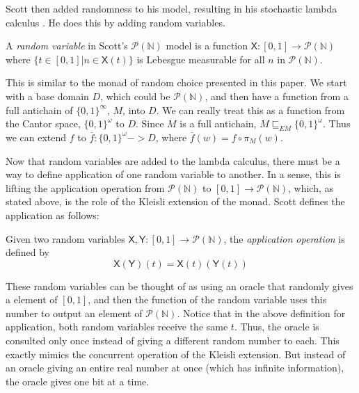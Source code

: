 Scott then added randomness to his model, resulting in his stochastic lambda calculus \cite{scott2014stochastic}.  He does this by adding random variables.

\begin{definition}
A \emph{random variable} in Scott's $\mathcal{P}(\mathbb{N})$ model is a function $\mathsf{X}:[0,1]\to \mathcal{P}(\mathbb{N})$ where $\{t\in [0,1]|n\in \mathsf{X}(t)\}$ is Lebesgue measurable for all $n$ in $\mathcal{P}(\mathbb{N})$.
\end{definition}

This is similar to the monad of random choice presented in this paper.  We start with a base domain $D$, which could be $\mathcal{P}(\mathbb{N})$, and then have a function from a full antichain of $\{0,1\}^\infty$, $M$, into $D$.  We can really treat this as a function from the Cantor space, $\{0,1\}^\omega$ to $D$.  Since $M$ is a full antichain, $M \sqsubseteq_{EM} \{0,1\}^\omega$.  Thus we can extend $f$ to $\overline{f}:\{0,1\}^\omega-> D$, where $\overline{f}(w) = f\circ \pi_M(w)$.

Now that random variables are added to the lambda calculus, there must be a way to define application of one random variable to another.  In a sense, this is lifting the application operation from $\mathcal{P}(\mathbb{N})$ to  $[0,1]\to \mathcal{P}(\mathbb{N})$, which, as stated above, is the role of the Kleisli extension of the monad.  Scott defines the application as follows:

\begin{definition}
Given two random variables $\mathsf{X}, \mathsf{Y}:[0,1]\to\mathcal{P}(\mathbb{N})$, the \emph{application operation} is defined by
\[
\mathsf{X}(\mathsf{Y})(t) = \mathsf{X}(t)(\mathsf{Y}(t))
\]
\end{definition}

These random variables can be thought of as using an oracle that randomly gives a element of $[0,1]$, and then the function of the random variable uses this number to output an element of $\mathcal{P}(\mathbb{N})$.  Notice that in the above definition for application, both random variables receive the same $t$.  Thus, the oracle is consulted only once instead of giving a different random number to each.  This exactly mimics the concurrent operation of the Kleisli extension.  But instead of an oracle giving an entire real number at once (which has infinite information), the oracle gives one bit at a time.

